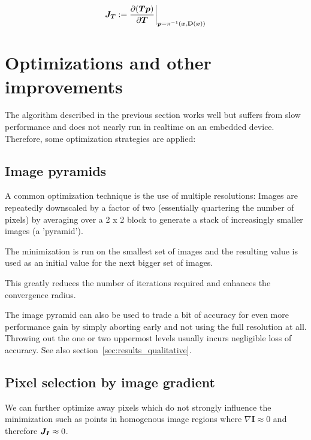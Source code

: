 \begin{equation}
    \mat{J_T} := \frac{\partial (\vec{T} \vec{p})}{\partial \vec{T}}
    \bigg|_{\vec{p} = \pi^{-1}(\vec{x}, \mathbf{D}(\vec{x}))}
\end{equation}








\section{Optimizations and other improvements}
\label{sec:optimizations}

The algorithm described in the previous section works well but suffers from
slow performance and does not nearly run in realtime on an embedded device.
Therefore, some optimization strategies are applied:

\subsection{Image pyramids}
\label{sec:pyramids}

A common optimization technique is the use of multiple resolutions: Images are
repeatedly downscaled by a factor of two (essentially quartering the number of
pixels) by averaging over a 2 x 2 block to generate a stack of increasingly
smaller images (a 'pyramid').

The minimization is run on the smallest set of images and the resulting value
is used as an initial value for the next bigger set of images.

This greatly reduces the number of iterations required and enhances the
convergence radius.

The image pyramid can also be used to trade a bit of accuracy for even more
performance gain by simply aborting early and not using the full resolution at
all. Throwing out the one or two uppermost levels usually incurs negligible
loss of accuracy. See also section~\ref{sec:results_qualitative}.


\subsection{Pixel selection by image gradient}
\label{subsec:gradient_filtering}

We can further optimize away pixels which do not strongly influence the
minimization such as points in homogenous image regions where $\nabla
\mathbf{I} \approx 0$ and therefore $\mat{J_I} \approx 0$.

